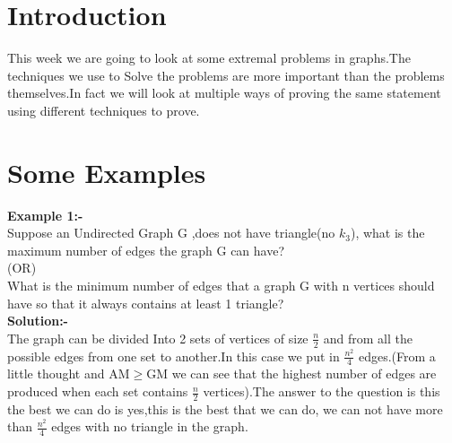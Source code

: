 \section{Introduction}
This week we are going to look at some extremal problems in graphs.The techniques we use to Solve the problems are more important than the problems themselves.In fact we will look at multiple ways of proving the same statement using different techniques to prove.\\
\section{Some Examples}
\textbf{Example 1:-}\\
Suppose an Undirected Graph G ,does not have triangle(no $k_3$), what is the maximum number of edges the graph G can have?\\
(OR)\\ 
What is the minimum number of edges that a graph G with n vertices should have so that it always contains at least 1 triangle?\\
\textbf{Solution:-}\\
The graph can be divided Into 2 sets of vertices of size $\frac{n}{2}$ and from all the possible edges from one set to another.In this case we put in $\frac{n^2}{4}$ edges.(From a little thought and AM$ \geq $GM we can see that the highest number of edges are produced when each set contains $\frac{n}{2}$ vertices).The answer to the question is this the best we can do is yes,this is the best that we can do, we can not have more than $\frac{n^2}{4}$ edges with no triangle in the graph.
